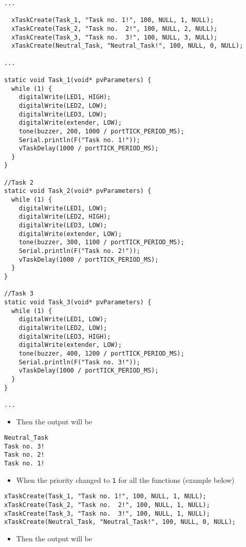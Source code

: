 \documentclass{article}
\begin{document}
\begin{lstlisting}[style=cpp]
... 

  xTaskCreate(Task_1, "Task no. 1!", 100, NULL, 1, NULL);
  xTaskCreate(Task_2, "Task no.  2!", 100, NULL, 2, NULL);
  xTaskCreate(Task_3, "Task no.  3!", 100, NULL, 3, NULL);
  xTaskCreate(Neutral_Task, "Neutral_Task!", 100, NULL, 0, NULL);

...

static void Task_1(void* pvParameters) {
  while (1) {
    digitalWrite(LED1, HIGH);
    digitalWrite(LED2, LOW);
    digitalWrite(LED3, LOW);
    digitalWrite(extender, LOW);
    tone(buzzer, 200, 1000 / portTICK_PERIOD_MS);
    Serial.println(F("Task no. 1!"));
    vTaskDelay(1000 / portTICK_PERIOD_MS);
  }
}

//Task 2
static void Task_2(void* pvParameters) {
  while (1) {
    digitalWrite(LED1, LOW);
    digitalWrite(LED2, HIGH);
    digitalWrite(LED3, LOW);
    digitalWrite(extender, LOW);
    tone(buzzer, 300, 1100 / portTICK_PERIOD_MS);
    Serial.println(F("Task no. 2!"));
    vTaskDelay(1000 / portTICK_PERIOD_MS);
  }
}

//Task 3
static void Task_3(void* pvParameters) {
  while (1) {
    digitalWrite(LED1, LOW);
    digitalWrite(LED2, LOW);
    digitalWrite(LED3, HIGH);
    digitalWrite(extender, LOW);
    tone(buzzer, 400, 1200 / portTICK_PERIOD_MS);
    Serial.println(F("Task no. 3!"));
    vTaskDelay(1000 / portTICK_PERIOD_MS);
  }
}

...

\end{lstlisting}
\begin{itemize}
    \item Then the output will be
\end{itemize}
\begin{lstlisting}[style=txt]
Neutral_Task
Task no. 3!
Task no. 2!
Task no. 1!
\end{lstlisting}
\begin{itemize}
    \item When the priority changed to \texttt{1} for all the functions (example below)
\end{itemize}
\begin{lstlisting}[style=cpp]
xTaskCreate(Task_1, "Task no. 1!", 100, NULL, 1, NULL);
xTaskCreate(Task_2, "Task no.  2!", 100, NULL, 1, NULL);
xTaskCreate(Task_3, "Task no.  3!", 100, NULL, 1, NULL);
xTaskCreate(Neutral_Task, "Neutral_Task!", 100, NULL, 0, NULL);
\end{lstlisting}
\begin{itemize}
    \item Then the output will be
\end{itemize}
\end{document}
